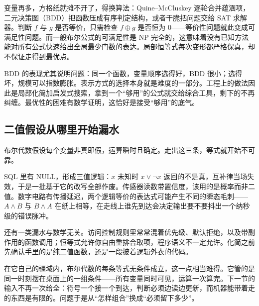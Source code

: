 变量再多，方格纸就摊不开了，得换算法：Quine--McCluskey 逐轮合并蕴涵项，二元决策图（BDD）把函数压成有序判定结构，或者干脆把问题交给 SAT 求解器。判断 \(f\) 与 \(g\) 是否等价，只需检查 \(f\oplus g\) 是否恒为 \(0\)——等价性问题就此变成可满足性问题。而一般布尔公式的可满足性是 NP 完全的，这意味着没有已知方法能对所有公式快速给出全局最少门数的表达。局部恒等式每次变形都严格保真，却不保证走得到最优点。

BDD 的表现尤其说明问题：同一个函数，变量顺序选得好，BDD 很小；选得坏，规模可以指数膨胀。表示方式的选择本身就是难度的一部分。工程上的做法因此是局部化简加启发式搜索，拿到一个``够用''的公式就交给综合工具，剩下的不再纠缠。最优性的困难有数学证明，这恰好是接受``够用''的底气。

\subsection{二值假设从哪里开始漏水}

布尔代数假设每个变量非真即假，运算瞬时且确定。走出这三条，等式就开始不可靠。

SQL 里有 NULL，形成三值逻辑：\(x\) 未知时 \(x\lor\neg x\) 返回的不是真，互补律当场失效，于是一批基于它的改写全部作废。传感器读数带置信度，该用的是概率而非二值。数字电路有传播延迟，两个逻辑等价的表达式可能产生不同的瞬态毛刺——\(A\land B\) 与 \(B\land A\) 在纸上相等，在走线上谁先到达会决定输出要不要抖出一个纳秒级的错误脉冲。

还有一类漏水与数学无关。访问控制规则里常常混着优先级、默认拒绝，以及带副作用的函数调用；恒等式允许你自由重排合取项，程序语义不一定允许。化简之前先确认手里的是纯二值函数，还是一段披着逻辑外衣的代码。

在它自己的疆域内，布尔代数的每条等式无条件成立，这一点相当难得。它管的是同一时刻摆在桌面上的一组条件——所有变量同时可见，运算一次算完。下一节的输入不再一次给全：符号一个接一个到达，判断必须边读边更新，而机器能带着走的东西是有限的。问题于是从``怎样组合''换成``必须留下多少''。
